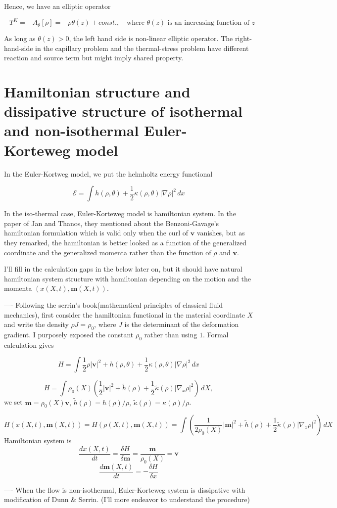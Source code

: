 \documentclass[a4paper,12pt]{article}
\begin{document}
Hence, we have an elliptic operator

{{{$$-T^K = -A_\theta[\rho] = -\rho\theta(z) + const., \quad \text{where $\theta(z)$ is an increasing function of $z$} $$}}}

As long as $\theta(z)>0$, the left hand side is non-linear elliptic operator. The right-hand-side in the capillary problem and the thermal-stress problem have different reaction and source term but might imply shared property.

\section{Hamiltonian structure and dissipative structure of isothermal and non-isothermal Euler-Korteweg model}
In the Euler-Kortweg model, we put the helmholtz energy functional

{{{ $$ \mathcal{E} = \int h(\rho,\theta) + \frac{1}{2}\kappa(\rho,\theta) |\nabla\rho|^2 \, dx $$ }}}

In the iso-thermal case, Euler-Korteweg model is hamiltonian system. In the paper of Jan and Thanos, they mentioned about the Benzoni-Gavage's hamiltonian formulation which is valid only when the curl of $\mathbf{v}$ vanishes, but as they remarked, the hamiltonian is better looked as a function of the generalized coordinate and the generalized momenta rather than the function of $\rho$ and $\mathbf{v}$.

I'll fill in the calculation gaps in the below later on, but it should have natural hamiltonian system structure with hamiltonian depending on the motion and the momenta $(x(X,t), \mathbf{m}(X,t))$.

----
Following the serrin's book(mathematical principles of classical fluid mechanics), first consider the hamiltonian functional in the material coordinate $X$ and write the density {{{$\rho J = \rho_0$}}}, where $J$ is the determinant of the deformation gradient. I purposely exposed the constant {{{$\rho_0$}}} rather than using $1$. Formal calculation gives

{{{ $$ H = \int \frac{1}{2} \rho|\mathbf{v}|^2 + h(\rho,\theta) + \frac{1}{2}\kappa(\rho,\theta) |\nabla\rho|^2 \, dx $$ }}}

{{{ $$ H = \int \rho_0(X) \left(\frac{1}{2} |\mathbf{v}|^2 + \tilde{h}(\rho) + \frac{1}{2}\tilde{\kappa}(\rho) |\nabla_{x}\rho|^2\right) \, dX, $$ }}} we set {{{$\mathbf{m} = \rho_0(X)\mathbf{v}$, $\tilde{h}(\rho) = h(\rho)/\rho$, $\tilde{\kappa}(\rho)= \kappa(\rho)/\rho$}}}.

{{{ $$ H(x(X,t),\mathbf{m}(X,t)) = H(\rho(X,t),\mathbf{m}(X,t)) = \int \left(\frac{1}{2\rho_0(X)} |\mathbf{m}|^2 + \tilde{h}(\rho) + \frac{1}{2}\tilde{\kappa}(\rho) |\nabla_{x}\rho|^2\right) \, dX $$ }}} Hamiltonian system is {{{ $$\frac{dx(X,t)}{dt} = \frac{\delta H}{\delta \mathbf{m}} = \frac{\mathbf{m}}{\rho_0(X)} =  \mathbf{v}  $$}}} {{{ $$\frac{d\mathbf{m}(X,t)}{dt} = -\frac{\delta H}{\delta x} $$}}}

----
When the flow is non-isothermal, Euler-Korteweg system is dissipative with modification of Dunn \& Serrin. (I'll more endeavor to understand the procedure)
\end{document}

